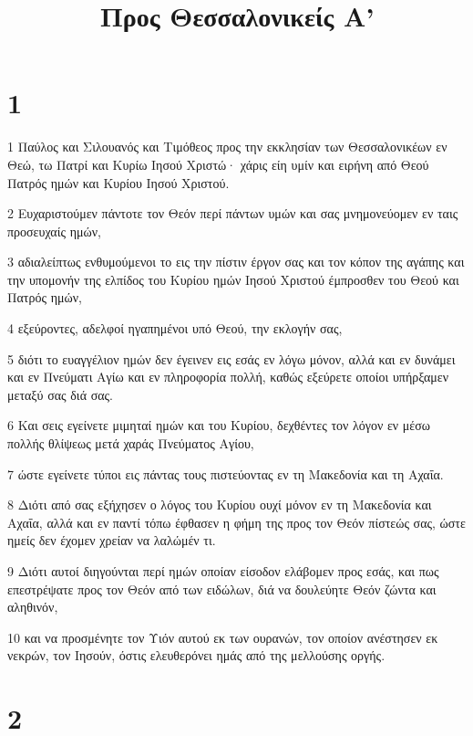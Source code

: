 

\title{Προς Θεσσαλονικείς Α'}


\chapter{1}

\par 1 Παύλος και Σιλουανός και Τιμόθεος προς την εκκλησίαν των Θεσσαλονικέων εν Θεώ, τω Πατρί και Κυρίω Ιησού Χριστώ· χάρις είη υμίν και ειρήνη από Θεού Πατρός ημών και Κυρίου Ιησού Χριστού.
\par 2 Ευχαριστούμεν πάντοτε τον Θεόν περί πάντων υμών και σας μνημονεύομεν εν ταις προσευχαίς ημών,
\par 3 αδιαλείπτως ενθυμούμενοι το εις την πίστιν έργον σας και τον κόπον της αγάπης και την υπομονήν της ελπίδος του Κυρίου ημών Ιησού Χριστού έμπροσθεν του Θεού και Πατρός ημών,
\par 4 εξεύροντες, αδελφοί ηγαπημένοι υπό Θεού, την εκλογήν σας,
\par 5 διότι το ευαγγέλιον ημών δεν έγεινεν εις εσάς εν λόγω μόνον, αλλά και εν δυνάμει και εν Πνεύματι Αγίω και εν πληροφορία πολλή, καθώς εξεύρετε οποίοι υπήρξαμεν μεταξύ σας διά σας.
\par 6 Και σεις εγείνετε μιμηταί ημών και του Κυρίου, δεχθέντες τον λόγον εν μέσω πολλής θλίψεως μετά χαράς Πνεύματος Αγίου,
\par 7 ώστε εγείνετε τύποι εις πάντας τους πιστεύοντας εν τη Μακεδονία και τη Αχαΐα.
\par 8 Διότι από σας εξήχησεν ο λόγος του Κυρίου ουχί μόνον εν τη Μακεδονία και Αχαΐα, αλλά και εν παντί τόπω έφθασεν η φήμη της προς τον Θεόν πίστεώς σας, ώστε ημείς δεν έχομεν χρείαν να λαλώμέν τι.
\par 9 Διότι αυτοί διηγούνται περί ημών οποίαν είσοδον ελάβομεν προς εσάς, και πως επεστρέψατε προς τον Θεόν από των ειδώλων, διά να δουλεύητε Θεόν ζώντα και αληθινόν,
\par 10 και να προσμένητε τον Υιόν αυτού εκ των ουρανών, τον οποίον ανέστησεν εκ νεκρών, τον Ιησούν, όστις ελευθερόνει ημάς από της μελλούσης οργής.

\chapter{2}

